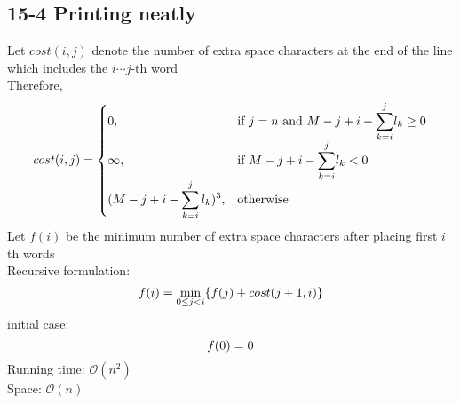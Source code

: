 \subsection*{15-4 Printing neatly}
\noindent Let $cost(i, j)$ denote the number of extra space characters at the end of the line which includes the $i \cdots j$-th word \\
Therefore,
\begin{equation} \notag
	cost(i, j) = \begin{cases}
		0,	& \mbox{if } j = n \mbox{ and } M - j + i - \displaystyle{\sum^{j}_{k = i}} l_k \geq 0 \\
		\infty,	& \mbox{if } M - j + i - \displaystyle{\sum^{j}_{k = i}} l_k < 0 \\
		\displaystyle{(M - j + i - \sum^{j}_{k = i} l_k)^3},	& \mbox{otherwise}
	\end{cases}
\end{equation}
Let $f(i)$ be the minimum number of extra space characters after placing first $i$th words \\
Recursive formulation:
\begin{equation} \notag
	f(i) = \min_{0 \leq j < i}\{f(j) + cost(j + 1, i)\}
\end{equation}
initial case:
\begin{equation} \notag
	f(0) = 0
\end{equation}
Running time: $\mathcal{O}(n^2)$ \\
Space: $\mathcal{O}(n)$

